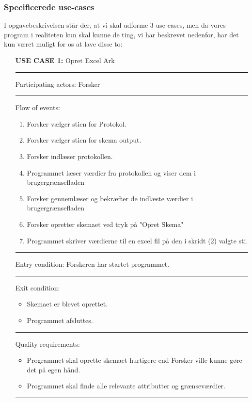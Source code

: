 \documentclass[11pt]{article}
\begin{document}
\subsubsection{Specificerede use-cases}
I opgavebeskrivelsen står der, at vi skal udforme 3 use-cases, men da vores program i realiteten kun skal kunne de ting, vi har beskrevet nedenfor, har det kun været muligt for os at lave disse to:\\
\begin{itemize}
\item[\textbf{USE CASE 1:}] Opret Excel Ark\\
\noindent\rule{14cm}{0.4pt}

\item [Participating actors:] \quad Forsker \\
\noindent\rule{14cm}{0.4pt}

\item [Flow of events:]
\begin{enumerate}
\item Forsker vælger stien for Protokol.
\item Forsker vælger stien for skema output.
\item Forsker indlæser protokollen.
\item Programmet læser værdier fra protokollen og viser dem i brugergrænsefladen
\item Forsker gennemlæser og bekræfter de indlæste værdier i brugergrænsefladen
\item Forsker opretter skemaet ved tryk på "Opret Skema"
\item Programmet skriver værdierne til en excel fil på den i skridt (2) valgte sti.
\end{enumerate}
\noindent\rule{14cm}{0.4pt}
\item[Entry condition:] Forskeren har startet programmet.\\
\noindent\rule{14cm}{0.4pt}

\item[Exit condition:]
\begin{itemize}
  \item Skemaet er blevet oprettet.
  \item Programmet afsluttes.
\end{itemize}
\noindent\rule{14cm}{0.4pt}
\item[Quality requirements:]
\begin{itemize}
\item Programmet skal oprette skemaet hurtigere end Forsker ville kunne gøre det på egen hånd.
\item Programmet skal finde alle relevante attributter og grænseværdier.
\end{itemize}

\noindent\rule{14cm}{0.4pt} \hfill \\

\end{itemize}
\end{document}
